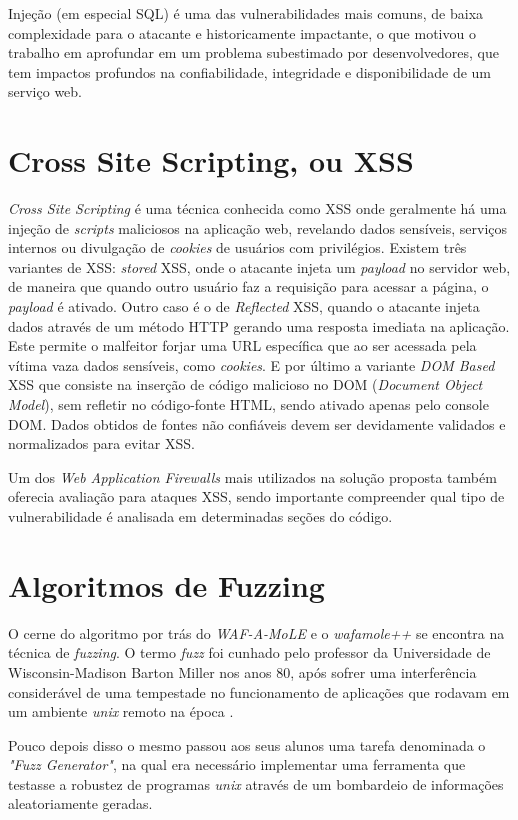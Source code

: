 Injeção (em especial SQL) é uma das vulnerabilidades mais comuns, de baixa complexidade para o atacante e historicamente impactante, o que motivou o trabalho em aprofundar em um problema subestimado por desenvolvedores, que tem impactos profundos na confiabilidade, integridade e disponibilidade de um serviço web.

\section{Cross Site Scripting, ou XSS}
\textit{Cross Site Scripting} é uma técnica conhecida como XSS onde geralmente há uma injeção de \textit{scripts} maliciosos na aplicação web, revelando dados sensíveis, serviços internos ou divulgação de \textit{cookies} de usuários com privilégios.
Existem três variantes de XSS: \textit{stored} XSS, onde o atacante injeta um \textit{payload} no servidor web, de maneira que quando outro usuário faz a requisição para acessar a página, o \textit{payload} é ativado. Outro caso é o de \textit{Reflected} XSS, quando o atacante injeta dados através de um método HTTP gerando uma resposta imediata na aplicação. Este permite o malfeitor forjar uma URL específica que ao ser acessada pela vítima vaza dados sensíveis, como \textit{cookies}. E por último a variante \textit{DOM Based} XSS que consiste na inserção de código malicioso no DOM (\textit{Document Object Model}), sem refletir no código-fonte HTML, sendo ativado apenas pelo console DOM.
Dados obtidos de fontes não confiáveis devem ser devidamente validados e normalizados para evitar XSS.

Um dos \textit{Web Application Firewalls} mais utilizados na solução proposta também oferecia avaliação para ataques XSS, sendo importante compreender qual tipo de vulnerabilidade é analisada em determinadas seções do código.


\section{Algoritmos de Fuzzing}

O cerne do algoritmo por trás do \textit{WAF-A-MoLE} e o \textit{wafamole++} se encontra na técnica de \textit{fuzzing}. O termo \textit{fuzz} foi cunhado pelo professor da Universidade de Wisconsin-Madison Barton Miller nos anos 80, após sofrer uma interferência considerável de uma tempestade no funcionamento de aplicações que rodavam em um ambiente \textit{unix} remoto na época \cite{fuzzing_info}. 

Pouco depois disso o mesmo passou aos seus alunos uma tarefa denominada o \textit{"Fuzz Generator"}, na qual era necessário implementar uma ferramenta que testasse a robustez de programas \textit{unix} através de um bombardeio de informações aleatoriamente geradas.

